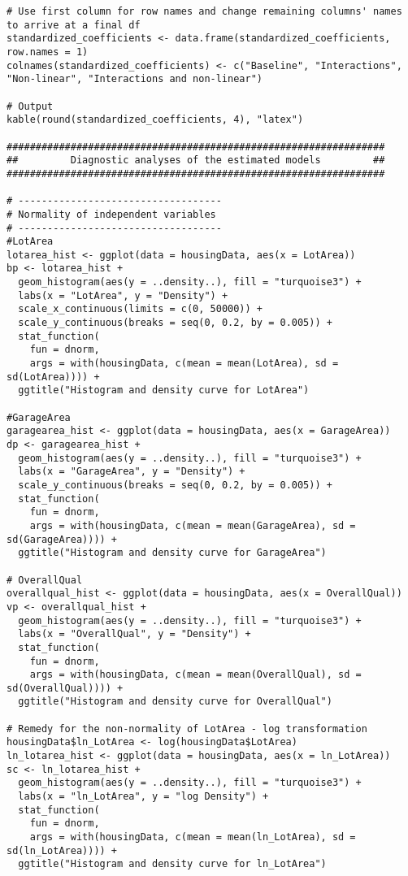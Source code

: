 \documentclass{article}
\begin{document}
\begin{tiny}
\begin{verbatim}
# Use first column for row names and change remaining columns' names to arrive at a final df
standardized_coefficients <- data.frame(standardized_coefficients, row.names = 1)
colnames(standardized_coefficients) <- c("Baseline", "Interactions", "Non-linear", "Interactions and non-linear")

# Output 
kable(round(standardized_coefficients, 4), "latex")

#################################################################
##         Diagnostic analyses of the estimated models         ##
#################################################################

# -----------------------------------
# Normality of independent variables
# -----------------------------------
#LotArea
lotarea_hist <- ggplot(data = housingData, aes(x = LotArea))
bp <- lotarea_hist + 
  geom_histogram(aes(y = ..density..), fill = "turquoise3") + 
  labs(x = "LotArea", y = "Density") + 
  scale_x_continuous(limits = c(0, 50000)) +
  scale_y_continuous(breaks = seq(0, 0.2, by = 0.005)) +
  stat_function(
    fun = dnorm, 
    args = with(housingData, c(mean = mean(LotArea), sd = sd(LotArea)))) +
  ggtitle("Histogram and density curve for LotArea")

#GarageArea
garagearea_hist <- ggplot(data = housingData, aes(x = GarageArea))
dp <- garagearea_hist + 
  geom_histogram(aes(y = ..density..), fill = "turquoise3") + 
  labs(x = "GarageArea", y = "Density") + 
  scale_y_continuous(breaks = seq(0, 0.2, by = 0.005)) +
  stat_function(
    fun = dnorm, 
    args = with(housingData, c(mean = mean(GarageArea), sd = sd(GarageArea)))) +
  ggtitle("Histogram and density curve for GarageArea")

# OverallQual
overallqual_hist <- ggplot(data = housingData, aes(x = OverallQual))
vp <- overallqual_hist + 
  geom_histogram(aes(y = ..density..), fill = "turquoise3") + 
  labs(x = "OverallQual", y = "Density") + 
  stat_function(
    fun = dnorm, 
    args = with(housingData, c(mean = mean(OverallQual), sd = sd(OverallQual)))) +
  ggtitle("Histogram and density curve for OverallQual")

# Remedy for the non-normality of LotArea - log transformation
housingData$ln_LotArea <- log(housingData$LotArea)
ln_lotarea_hist <- ggplot(data = housingData, aes(x = ln_LotArea))
sc <- ln_lotarea_hist + 
  geom_histogram(aes(y = ..density..), fill = "turquoise3") + 
  labs(x = "ln_LotArea", y = "log Density") + 
  stat_function(
    fun = dnorm, 
    args = with(housingData, c(mean = mean(ln_LotArea), sd = sd(ln_LotArea)))) +
  ggtitle("Histogram and density curve for ln_LotArea")


\end{verbatim}
\end{tiny}
\end{document}

